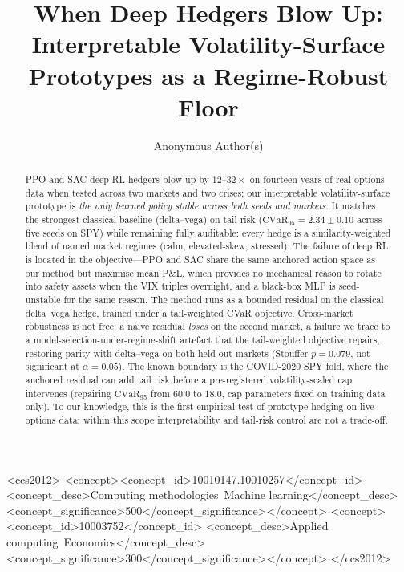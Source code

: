 \documentclass[sigconf,anonymous]{acmart}
\begin{document}

\title{When Deep Hedgers Blow Up: Interpretable Volatility-Surface
Prototypes as a Regime-Robust Floor}

\author{Anonymous Author(s)}

\renewcommand{\shortauthors}{Anonymous}

\begin{abstract}
PPO and SAC deep-RL hedgers blow up by $12$--$32\times$ on fourteen years of real
options data when tested across two markets and two crises; our interpretable
volatility-surface prototype is \emph{the only learned policy stable across both seeds
and markets}. It matches the strongest classical baseline (delta--vega) on tail
risk ($\mathrm{CVaR}_{95}=2.34\!\pm\!0.10$ across five seeds on SPY) while remaining
fully auditable: every hedge is a similarity-weighted blend of named market regimes
(calm, elevated-skew, stressed). The failure of deep RL is located in the
objective---PPO and SAC share the same anchored action space as our method but
maximise mean P\&L, which provides no mechanical reason to rotate into safety assets
when the VIX triples overnight, and a black-box MLP is seed-unstable for the same
reason. The method runs as a bounded residual on the classical delta--vega hedge,
trained under a tail-weighted CVaR objective. Cross-market robustness is not free:
a naive residual \emph{loses} on the second market, a failure we trace to a
model-selection-under-regime-shift artefact that the tail-weighted objective repairs,
restoring parity with delta--vega on both held-out markets (Stouffer $p=0.079$,
not significant at $\alpha=0.05$). The known
boundary is the COVID-2020 SPY fold, where the anchored residual can add tail risk
before a pre-registered volatility-scaled cap intervenes (repairing $\mathrm{CVaR}_{95}$ from
$60.0$ to $18.0$, cap parameters fixed on training data only). To our knowledge, this
is the first empirical test of prototype hedging on live options data; within
this scope interpretability and tail-risk control are not a trade-off.
\end{abstract}

\begin{CCSXML}
<ccs2012>
<concept><concept_id>10010147.10010257</concept_id>
<concept_desc>Computing methodologies~Machine learning</concept_desc>
<concept_significance>500</concept_significance></concept>
<concept><concept_id>10003752</concept_id>
<concept_desc>Applied computing~Economics</concept_desc>
<concept_significance>300</concept_significance></concept>
</ccs2012>
\end{CCSXML}
\end{document}
